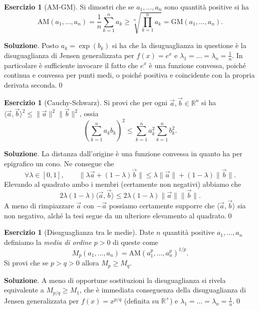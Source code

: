 \documentclass[a4paper,twoside]{article}
\newcommand{\R}{\mathbb{R}}
\theoremstyle{definition}
\newtheorem{ex}[theorem]{Esercizio}
\numberwithin{theorem}{section}
\begin{document}
\begin{ex}[AM-GM] Si dimostri che se $a_1,\ldots,a_n$ sono quantità positive si ha 
$$ \text{AM}\left(a_1,\ldots,a_n\right) = \frac{1}{n}\sum_{k=1}^{n}a_k \geq \sqrt[n]{\prod_{k=1}^{n}a_k} = \text{GM}\left(a_1,\ldots,a_n\right). $$ 
\end{ex}
\textbf{Soluzione}. Posto $a_k = \exp\left(b_k\right)$ si ha che la disuguaglianza in questione è la disuguaglianza di Jensen generalizzata per $f(x)=e^x$ e $\lambda_1=\ldots=\lambda_n=\frac{1}{n}$. In particolare è sufficiente invocare il fatto che $e^x$ è una funzione convessa, poiché continua e convessa per punti medi, o poiché positiva e coincidente con la propria derivata seconda.\qed

\begin{ex}[Cauchy-Schwarz] Si provi che per ogni $\vec{a},\vec{b}\in\R^n$ si ha $\langle \vec{a},\vec{b}\rangle^2 \leq \|\vec{a}\|^2\|\vec{b}\|^2$, ossia 
$$ \left(\sum_{k=1}^{n} a_k b_k\right)^2 \leq \sum_{k=1}^{n} a_k^2 \sum_{k=1}^{n} b_k^2. $$
\end{ex}
\textbf{Soluzione}. La distanza dall'origine è una funzione convessa in quanto ha per epigrafico un cono. Ne consegue che 
$$\forall \lambda\in[0,1],\qquad \|\lambda\vec{a}+(1-\lambda)\vec{b}\| \leq \lambda\|\vec{a}\|+(1-\lambda)\|\vec{b}\|. $$
Elevando al quadrato ambo i membri (certamente non negativi) abbiamo che 
$$ 2\lambda(1-\lambda)\langle\vec{a},\vec{b}\rangle\leq 2\lambda(1-\lambda)\|\vec{a}\|\|\vec{b}\|. $$
A meno di rimpiazzare $\vec{a}$ con $-\vec{a}$ possiamo certamente supporre che $\langle\vec{a},\vec{b}\rangle$ sia non negativo, alché la tesi segue da un ulteriore elevamento al quadrato.\qed 

\begin{ex}[Disuguaglianza tra le medie] Date $n$ quantità positive $a_1,\ldots,a_n$ definiamo la \emph{media di ordine $p>0$} di queste come 
$$ M_p\left(a_1,\ldots,a_n\right) = \text{AM}\left(a_1^p,\ldots,a_n^p\right)^{1/p}.$$
Si provi che se $p>q>0$ allora $M_p \geq M_q$. 
\end{ex}
\textbf{Soluzione}. A meno di opportune sostituzioni la disuguaglianza si rivela equivalente a $M_{p/q}\geq M_1$, che è immediata conseguenza della disuguaglianza di Jensen generalizzata per $f(x)=x^{p/q}$ (definita su $\R^+$) e $\lambda_1=\ldots=\lambda_n=\frac{1}{n}$.\qed
\end{document}
